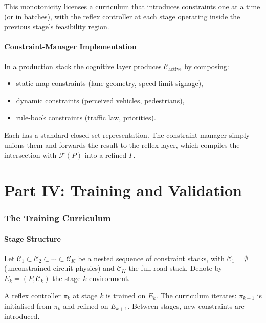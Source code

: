 \documentclass[11pt,twocolumn]{article}
\theoremstyle{definition}
\theoremstyle{remark}
\newcommand{\Feas}{\mathcal{F}}
\providecommand{\cC}{\mathcal{C}}
\begin{document}
This monotonicity licenses a curriculum that introduces constraints one at a time (or in batches), with the reflex controller at each stage operating inside the previous stage's feasibility region.

\subsection{Constraint-Manager Implementation}

In a production stack the cognitive layer produces $\cC_{\mathrm{active}}$ by composing:
\begin{itemize}[leftmargin=*,itemsep=2pt]
\item static map constraints (lane geometry, speed limit signage),
\item dynamic constraints (perceived vehicles, pedestrians),
\item rule-book constraints (traffic law, priorities).
\end{itemize}

Each has a standard closed-set representation. The constraint-manager simply unions them and forwards the result to the reflex layer, which compiles the intersection with $\Feas(P)$ into a refined $\Gamma$.

\bigskip

\part*{Part IV: Training and Validation}

\section{The Training Curriculum}
\label{sec:curriculum}

\subsection{Stage Structure}

Let $\cC_1 \subset \cC_2 \subset \cdots \subset \cC_K$ be a nested sequence of constraint stacks, with $\cC_1 = \emptyset$ (unconstrained circuit physics) and $\cC_K$ the full road stack. Denote by $E_k = (P, \cC_k)$ the stage-$k$ environment.

A reflex controller $\pi_k$ at stage $k$ is trained on $E_k$. The curriculum iterates: $\pi_{k+1}$ is initialised from $\pi_k$ and refined on $E_{k+1}$. Between stages, new constraints are introduced.
\end{document}
